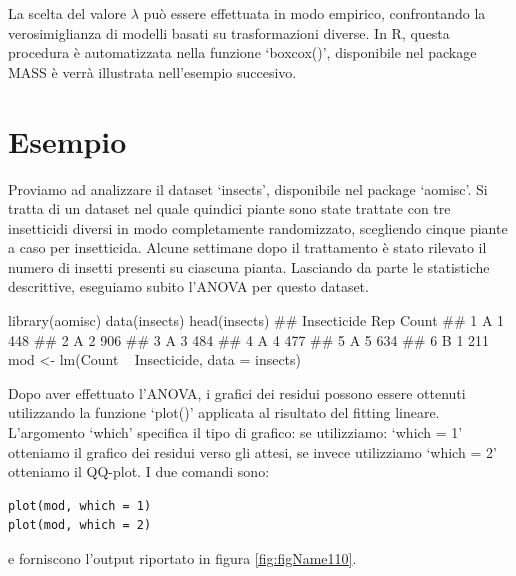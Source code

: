 \documentclass[a4paper,12pt,oneside]{book}
\newenvironment{Shaded}{}{}
\newcommand{\KeywordTok}[1]{#1}
\newcommand{\DataTypeTok}[1]{#1}
\newcommand{\StringTok}[1]{#1}
\newcommand{\CommentTok}[1]{#1}
\newcommand{\OperatorTok}[1]{#1}
\newcommand{\NormalTok}[1]{#1}
\begin{document}
La scelta del valore \(\lambda\) può essere effettuata in modo empirico, confrontando la verosimiglianza di modelli basati su trasformazioni diverse. In R, questa procedura è automatizzata nella funzione `boxcox()', disponibile nel package MASS è verrà illustrata nell'esempio succesivo.

\hypertarget{esempio}{%
\section{Esempio}\label{esempio}}

Proviamo ad analizzare il dataset `insects', disponibile nel package `aomisc'. Si tratta di un dataset nel quale quindici piante sono state trattate con tre insetticidi diversi in modo completamente randomizzato, scegliendo cinque piante a caso per insetticida. Alcune settimane dopo il trattamento è stato rilevato il numero di insetti presenti su ciascuna pianta. Lasciando da parte le statistiche descrittive, eseguiamo subito l'ANOVA per questo dataset.

\begin{Shaded}
\begin{Highlighting}[]
\KeywordTok{library}\NormalTok{(aomisc)}
\KeywordTok{data}\NormalTok{(insects)}
\KeywordTok{head}\NormalTok{(insects)}
\CommentTok{##   Insecticide Rep Count}
\CommentTok{## 1           A   1   448}
\CommentTok{## 2           A   2   906}
\CommentTok{## 3           A   3   484}
\CommentTok{## 4           A   4   477}
\CommentTok{## 5           A   5   634}
\CommentTok{## 6           B   1   211}
\NormalTok{mod <-}\StringTok{ }\KeywordTok{lm}\NormalTok{(Count }\OperatorTok{~}\StringTok{ }\NormalTok{Insecticide, }\DataTypeTok{data =}\NormalTok{ insects)}
\end{Highlighting}
\end{Shaded}

Dopo aver effettuato l'ANOVA, i grafici dei residui possono essere ottenuti utilizzando la funzione `plot()' applicata al risultato del fitting lineare. L'argomento `which' specifica il tipo di grafico: se utilizziamo: `which = 1' otteniamo il grafico dei residui verso gli attesi, se invece utilizziamo `which = 2' otteniamo il QQ-plot. I due comandi sono:

\begin{verbatim}
plot(mod, which = 1)
plot(mod, which = 2)
\end{verbatim}

e forniscono l'output riportato in figura \ref{fig:figName110}.
\end{document}
